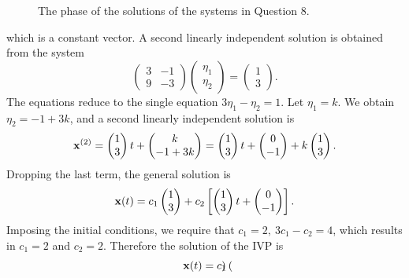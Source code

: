 \documentclass[11pt,a4paper]{article}
\begin{document}
\begin{enumerate}
\begin{figure}[H]
			\caption{The phase of the solutions of the systems in Question 8.}
		\end{figure}
		which is a constant vector. A second linearly independent solution is obtained from the system
		$$
		\begin{pmatrix}
			3 & -1\\
			9 & -3
		\end{pmatrix}
		\begin{pmatrix}
			\eta_1\\
			\eta_2
		\end{pmatrix} = 
		\begin{pmatrix}
			1\\
			3
		\end{pmatrix}.
		$$
		The equations reduce to the single equation $3\eta_1 - \eta_2 = 1$. Let $\eta_1 = k$. We obtain $\eta_2 = -1 + 3k$, and a second linearly independent solution is
		$$
		\vb{x}^{(2)} =
		\begin{pmatrix}
			1\\
			3
		\end{pmatrix}t +
		\begin{pmatrix}
			k\\
			-1+3k
		\end{pmatrix} =
		\begin{pmatrix}
			1\\
			3
		\end{pmatrix}t +
		\begin{pmatrix}
			0\\
			-1
		\end{pmatrix} + k
		\begin{pmatrix}
			1\\
			3
		\end{pmatrix}.
		$$
		Dropping the last term, the general solution is
		$$
		\vb{x}(t) = c_1
		\begin{pmatrix}
			1\\
			3
		\end{pmatrix} + c_2
		\left[
			\begin{pmatrix}
				1\\
				3
			\end{pmatrix}t +
			\begin{pmatrix}
				0\\
				-1
			\end{pmatrix}
		\right].
		$$
		Imposing the initial conditions, we require that $c_1 = 2,\ 3c_1 - c_2 = 4$, which results in $c_1 = 2$ and $c_2 = 2$. Therefore the solution of the IVP is
		$$
		\vb{x}(t) = c_1
		\begin{pmatrix}

\end{pmatrix}$$
\end{enumerate}
\end{document}
